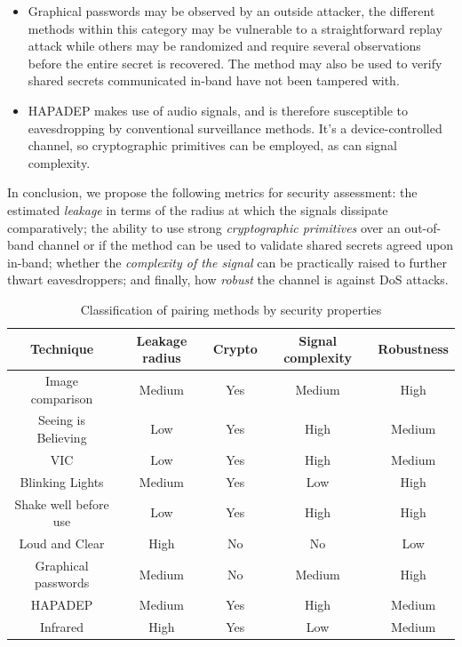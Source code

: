\documentclass[conference, 11pt]{sty/IEEEtran}
\begin{document}
\begin{itemize}
	\item Graphical passwords may be observed by an outside attacker, the different methods within this category may be vulnerable to a straightforward replay attack while others may be randomized and require several observations before the entire secret is recovered.
	The method may also be used to verify shared secrets communicated in-band have not been tampered with.
	\item HAPADEP makes use of audio signals, and is therefore susceptible to eavesdropping by conventional surveillance methods. It's a device-controlled channel, so cryptographic primitives can be employed, as can signal complexity.
\end{itemize}

In conclusion, we propose the following metrics for security assessment: the estimated \emph{leakage} in terms of the radius at which the signals dissipate comparatively; the ability to use strong \emph{cryptographic primitives} over an out-of-band channel or if the method can be used to validate shared secrets agreed upon in-band; whether the \emph{complexity of the signal} can be practically raised to further thwart eavesdroppers; and finally, how \emph{robust} the channel is against DoS attacks.

\hspace{-2em}
\begin{table}[t]
    \centering
    \normalsize{
\begin{tabular}{c|c|c|c|c}
	Technique & Leakage radius & Crypto & Signal complexity & Robustness \\
	\hline
	Image comparison & Medium & Yes & Medium & High\\
     Seeing is Believing & Low & Yes & High & Medium \\
		     VIC & Low & Yes & High & Medium\\
	 Blinking Lights & Medium & Yes & Low & High\\
	Shake well before use & Low & Yes & High & High \\
	       Loud and Clear & High & No & No & Low \\
      Graphical passwords & Medium & No & Medium & High \\
		 HAPADEP & Medium & Yes & High & Medium \\
	  Infrared & High & Yes & Low & Medium \\
\end{tabular}
}
    \caption{Classification of pairing methods by security properties}
    \label{table:security_properties}
\end{table}
\hspace{2em}
\end{document}
